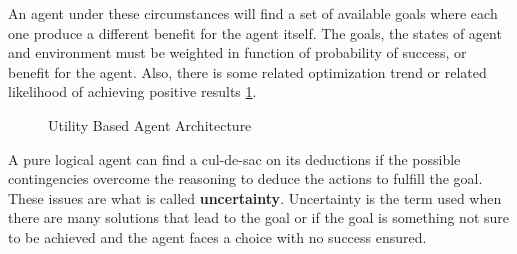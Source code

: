 \documentclass[11pt,oneside,a4paper,openright]{report}
\begin{document}
\begin{description}
\begin{description}
		An agent under these circumstances will find a set of available goals where each one produce a
		different benefit for the agent itself. The goals, the states of agent and environment must be 
		weighted in function of probability of success, or benefit for the agent. Also, there is some related
		optimization trend or related likelihood of achieving positive results \ref{fig:utilityAgent_label}. 


		\begin{figure}[htbp!]
		\centering
		\setlength\fboxsep{0pt}
		\setlength\fboxrule{0.5pt}
		\caption{Utility Based Agent Architecture}
		\label{fig:utilityAgent_label}
		\end{figure}


		A pure logical agent can find a cul-de-sac on its deductions if the possible contingencies overcome
		the reasoning to deduce the actions to fulfill the goal. These issues are what is called
		\textbf{uncertainty}. Uncertainty is the term used when there are many solutions that lead to the
		goal or if the goal is something not sure to be achieved and the agent faces a choice with no 
		success ensured. 


\end{description}
\end{description}
\end{document}
